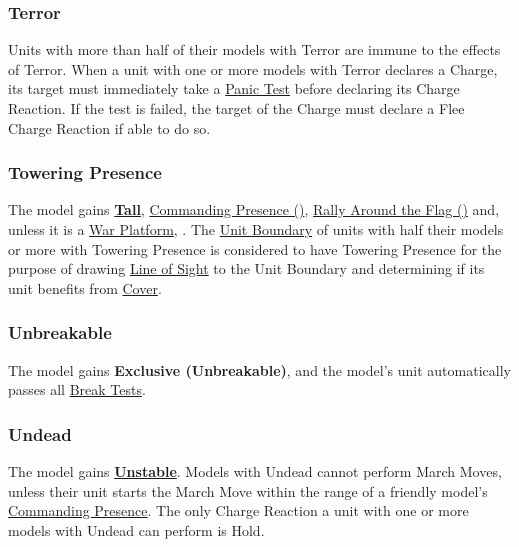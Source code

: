 \subsubsection{Terror}
\idx[main=y]{\terror}\label{terror}

Units with more than half of their models with Terror are immune to the effects of Terror. When a unit with one or more models with Terror declares a Charge, its target must immediately take a \hyperref[panic_test]{Panic Test} before declaring its Charge Reaction. If the test is failed, the target of the Charge must declare a Flee Charge Reaction if able to do so.

\subsubsection{Towering Presence}
\idx[main=y]{\toweringpresence}\label{towering_presence}

The model gains \hyperref[tall]{\textbf{Tall}}, \hyperref[commanding_presence]{Commanding Presence ()}, \hyperref[rally_around_the_flag]{Rally Around the Flag ()} and, unless it is a \hyperref[war_platform]{War Platform}, \textbf{\exclusive{}}.  The \hyperref[boundary_rectangle]{Unit Boundary} of units with half their models or more with Towering Presence is considered to have Towering Presence for the purpose of drawing \hyperref[line_of_sight]{Line of Sight} to the Unit Boundary and determining if its unit benefits from \hyperref[cover]{Cover}.

\subsubsection{Unbreakable}
\idx[main=y]{\unbreakable}\label{unbreakable}

The model gains \textbf{Exclusive (Unbreakable)}, and the model’s unit automatically passes all \hyperref[break_test]{Break Tests}.

\subsubsection{Undead}
\idx[main=y]{\undead}\label{undead}

The model gains \hyperref[unstable]{\textbf{Unstable}}. Models with Undead cannot perform March Moves, unless their unit starts the March Move within the range of a friendly model's \hyperref[commanding_presence]{Commanding Presence}. The only Charge Reaction a unit with one or more models with Undead can perform is Hold.

